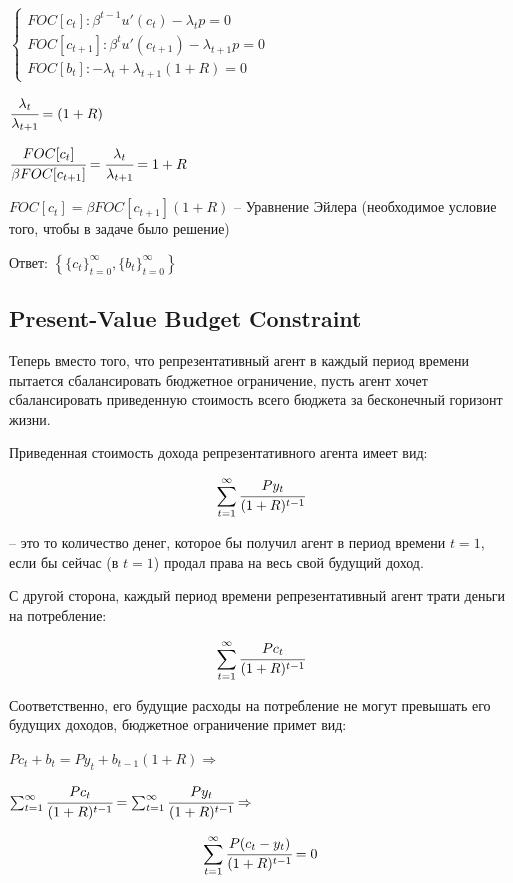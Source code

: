 \documentclass[reqno]{article}
\theoremstyle{definition}
\theoremstyle{definition}
\theoremstyle{definition}
\theoremstyle{definition}
\theoremstyle{definition}
\theoremstyle{definition}
\theoremstyle{definition}
\theoremstyle{definition}
\theoremstyle{definition}
\begin{document}
			$
			\begin{cases}
				FOC[c_t]: \beta^{t-1} u'(c_t)-\lambda_t p = 0 \\
				
				FOC[c_{t+1}]: \beta^{t} u'(c_{t+1})-\lambda_{t+1} p = 0 \\
				
				FOC[b_t]: -\lambda_t + \lambda_{t+1}(1+R) = 0
			\end{cases}
			$
			
			$\cfrac{\lambda_t}{\lambda_{t+1}} = (1+R)$
			
			$\cfrac{FOC[c_t]}{\beta FOC[c_{t+1}]} = \cfrac{\lambda_t}{\lambda_{t+1}} = 1+R$
			
			$FOC[c_t] = \beta FOC[c_{t+1}](1+R)$ -- Уравнение Эйлера (необходимое условие того, чтобы в задаче было решение)
			
			Ответ: $\left\{\{c_t\}_{t=0}^\infty, \{b_t\}_{t=0}^\infty \right\}$
			
			\subsection{Present-Value Budget Constraint}
			
			Теперь вместо того, что репрезентативный агент в каждый период времени пытается сбалансировать бюджетное ограничение, пусть агент хочет сбалансировать приведенную стоимость всего бюджета за бесконечный горизонт жизни.
			
			Приведенная стоимость дохода репрезентативного агента имеет вид:
			
			$$\sum_{t=1}^\infty \cfrac{P y_t}{(1+R)^{t-1}}$$
			
			-- это то количество денег, которое бы получил агент в период времени $t=1$, если бы сейчас (в $t=1$) продал права на весь свой будущий доход.
			
			С другой сторона, каждый период времени репрезентативный агент трати деньги на потребление:
			
			$$\sum_{t=1}^\infty \cfrac{P c_t}{(1+R)^{t-1}}$$
			
			Соответственно, его будущие расходы на потребление не могут превышать его будущих доходов, бюджетное ограничение примет вид:
			
			$P c_t + b_t = P y_t + b_{t-1} (1+R) \Rightarrow$
			
			$\sum_{t=1}^\infty \cfrac{P c_t}{(1+R)^{t-1}} = \sum_{t=1}^\infty \cfrac{P y_t}{(1+R)^{t-1}} \Rightarrow$
			
			 $$\sum_{t=1}^\infty \cfrac{P (c_t - y_t)}{(1+R)^{t-1}} = 0$$ \\
			 
\end{document}
